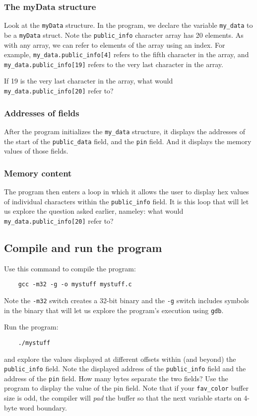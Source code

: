 \subsubsection{The myData structure}
Look at the {\tt myData} structure.  
In the program, we declare the variable {\tt my\_data} to be a {\tt myData} struct.
Note the {\tt public\_info} character array has 20 elements.  As with any array, we can refer 
to elements of the array using an index. For example, {\tt my\_data.public\_info[4]} refers to the
fifth character in the array, and {\tt my\_data.public\_info[19]} refers to the very last character
in the array.

If 19 is the very last character in the array, what would {\tt my\_data.public\_info[20]} refer to?

\subsubsection{Addresses of fields}
After the program initializes the {\tt my\_data} structure, it displays the addresses of the
start of the {\tt public\_data} field, and the {\tt pin} field.  And it displays the memory values of those
fields.

\subsubsection{Memory content}
The program then enters a loop in which it allows the user to display hex values of individual characters
within the {\tt public\_info} field.  It is this loop that will let us explore the question asked earlier,
nameley: what would {\tt my\_data.public\_info[20]} refer to?

\subsection{Compile and run the program}
Use this command to compile the program:
\begin{verbatim}
    gcc -m32 -g -o mystuff mystuff.c
\end{verbatim}
\noindent Note the {\tt -m32} switch creates a 32-bit binary and the {\tt -g} switch includes symbols in the 
binary that will let us explore the program's execution using {\tt gdb}.

Run the program:
\begin{verbatim}
    ./mystuff
\end{verbatim}
\noindent and explore the values displayed at different offsets within (and beyond) the {\tt public\_info} field.
Note the displayed address of the {\tt public\_info} field and the address of the {\tt pin} field.  How many 
bytes separate the two fields?  Use the program to display the value of the pin field.  Note that if
your {\tt fav\_color} buffer size is odd, the compiler will \textit{pad} the buffer so that the next
variable starts on 4-byte word boundary.

